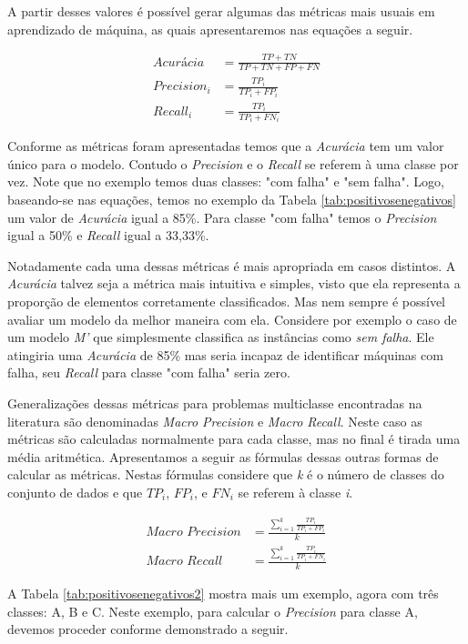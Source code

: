 A partir desses valores é possível gerar algumas das métricas mais usuais em aprendizado de máquina, as quais apresentaremos nas equações a seguir.

\begin{align*}
Acurácia &= \frac{TP+TN}{TP+TN+FP+FN} \\
Precision_i &= \frac{TP_i}{TP_i+FP_i} \\
Recall_i &= \frac{TP_i}{TP_i+FN_i}
\end{align*}

Conforme as métricas foram apresentadas temos que a \textit{Acurácia} tem um valor único para o modelo.
Contudo o \textit{Precision} e o \textit{Recall} se referem à uma classe por vez.
Note que no exemplo temos duas classes: "com falha" e "sem falha".
Logo, baseando-se nas equações, temos no exemplo da Tabela \ref{tab:positivosenegativos} um valor de \textit{Acurácia} igual a 85\%.
Para classe "com falha" temos o \textit{Precision} igual a 50\% e \textit{Recall} igual a 33,33\%.

Notadamente cada uma dessas métricas é mais apropriada em casos distintos.
A \textit{Acurácia} talvez seja a métrica mais intuitiva e simples, visto que ela representa a proporção de elementos corretamente classificados.
Mas nem sempre é possível avaliar um modelo da melhor maneira com ela.
Considere por exemplo o caso de um modelo \textit{M'} que simplesmente classifica as instâncias como \textit{sem falha}.
Ele atingiria uma \textit{Acurácia} de 85\% mas seria incapaz de identificar máquinas com falha, seu \textit{Recall} para classe "com falha" seria zero.

Generalizações dessas métricas para problemas multiclasse encontradas na literatura são denominadas \textit{Macro Precision} e \textit{Macro Recall}.
Neste caso as métricas são calculadas normalmente para cada classe, mas no final é tirada uma média aritmética.
Apresentamos a seguir as fórmulas dessas outras formas de calcular as métricas.
Nestas fórmulas considere que \textit{k} é o número de classes do conjunto de dados e que $TP_i$, $FP_i$, e $FN_i$ se referem à classe \textit{i}.

\begin{align*}
\textit{Macro Precision} &= \frac{\sum_{i=1}^{k} \frac{TP_i}{TP_i+FP_i}}{k} \\
\textit{Macro Recall} &= \frac{\sum_{i=1}^{k} \frac{TP_i}{TP_i+FN_i}}{k}
\end{align*}

A Tabela \ref{tab:positivosenegativos2} mostra mais um exemplo, agora com três classes: A, B e C.
Neste exemplo, para calcular o \textit{Precision} para classe A, devemos proceder conforme demonstrado a seguir.

